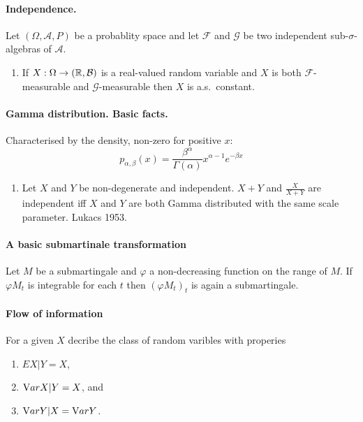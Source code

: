 \paragraph{Independence. }
Let $(\Omega, \mathcal A, P)$ be a probablity space and let $\mathcal F$ and
$\mathcal G$ be two independent sub-$\sigma$-algebras of $\mathcal A$.

\begin{enumerate} 
\item If $X: \Omega \to (\mathbb R, \mathcal B)$ is a
    real-valued random variable and $X$ is both $\mathcal F$-measurable
    and $\mathcal G$-measurable then $X$ is a.s.~constant.
\end{enumerate}


\paragraph{Gamma distribution. Basic facts. }

Characterised by the density, non-zero for positive $x$:
\begin{equation}
p_{\alpha, \beta}(x) = \frac{\beta^\alpha}{ \Gamma(\alpha)} x^{\alpha-1}e^{-\beta x}
\end{equation}

\begin{enumerate}
\item Let $X$ and $Y$ be non-degenerate and independent. 
    $X+Y$ and $\frac{X}{X+Y}$ are independent iff $X$ and $Y$
    are both Gamma distributed with the same scale parameter. 
    \src Lukacs 1953.
\end{enumerate}





\paragraph{A basic submartinale transformation}
Let $M$ be a submartingale and $\varphi$ a non-decreasing function
on the range of $M$. If $\varphi M_t$ is integrable for each $t$ then 
$\left( \varphi M_t \right)_t$ is again a submartingale.




\paragraph{Flow of information}
For a given $X$ decribe the class of random varibles with properies
\begin{enumerate}
\item $E X|Y = X$,
\item $\textrm Var X|Y = X$, and
\item $\textrm Var Y|X = \textrm Var Y$.
\end{enumerate}

